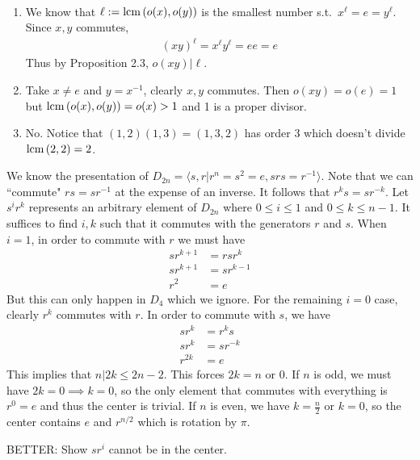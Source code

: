 \documentclass[12pt]{article}
\begin{document}
\begin{problem}[2]
~\begin{enumerate}[label=(\alph*)]
	\item We know that $ \ell:=\operatorname{lcm} \left( o(x),o(y) \right) $ is the smallest number s.t.\ $ x^{\ell} =e = y^{\ell} $. Since $ x,y$ commutes, 
		\begin{align*}
			(xy)^{ \ell} = x^{ \ell} y ^{ \ell} = e e = e
		\end{align*}
		Thus by Proposition 2.3, $ o(xy) | \ell$.
	\item Take $ x \neq e$ and $ y = x^{-1}$, clearly $ x,y$ commutes. Then $ o(xy) = o(e) = 1$ but $ \operatorname{lcm} \left( o(x),o(y) \right) = o(x) >1$ and 1 is a proper divisor.
	\item No. Notice that $ (1,2) (1,3) = (1,3,2)$ has order 3 which doesn't divide $ \operatorname{lcm} \left( 2,2 \right) =2$.
\end{enumerate}
\end{problem}
\begin{problem}[3]
We know the presentation of $ D_{2n} = \langle s,r| r^{n} = s ^2 = e, srs = r^{-1} \rangle$. Note that we can ``commute" $ rs=s r^{-1} $ at the expense of an inverse. It follows that $ r^{k}s = s r^{-k}$. Let $ s^{i} r^{k}$ represents an arbitrary element of $ D_{2n}$ where $ 0\leq i \leq 1$ and  $ 0\leq k \leq n-1$. It suffices to find $ i,k$ such that it commutes with the generators  $ r$ and  $ s$. When $i=1$, in order to commute with $ r$ we must have
\begin{align*}
	s r^{k+1} &= rs r^{k} \\
	s r^{k+1}&= sr^{k-1} \\
r^2&= e
\end{align*}
But this can only happen in $ D_4$ which we ignore. For the remaining $ i=0$ case, clearly $ r^{k}$ commutes with $ r$. In order to commute with $ s$, we have
		\begin{align*}
			s r^{k}&= r^{k}s \\
			sr^{k}&= s r^{-k} \\
			r^{2k} &= e 
		\end{align*}
		This implies that $ n|2k \leq 2n-2$. This forces $ 2k=n$ or 0. If $ n$ is odd, we must have $ 2k=0 \implies k =0$, so the only element that commutes with everything is $ r^{0} =e$ and thus the center is trivial. If $ n$ is even, we have $k= \frac{n}{2}$ or $ k=0$, so the center contains  $ e$ and  $ r^{n /2}$ which is rotation by $ \pi$.

BETTER:
Show $ sr^{i}$ cannot be in the center.
\end{problem}
\end{document}
